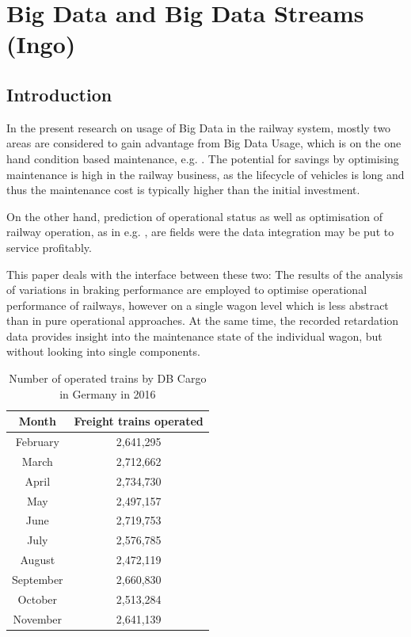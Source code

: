 \documentclass[a4paper, 12pt]{scrartcl}
\begin{document}
\section{Big Data and Big Data Streams (Ingo)}
\subsection{Introduction}
In the present research on usage of Big Data in the railway system, mostly two areas are considered to gain advantage from Big Data Usage, which is on the one hand condition based maintenance, e.g. \cite{fumeo2015condition, thaduri2015railway}. The potential for savings by optimising maintenance is high in the railway business, as the lifecycle of vehicles is long and thus the maintenance cost is typically higher than the initial investment.

On the other hand, prediction of operational status as well as optimisation of railway operation, as in e.g. \cite{papa2016delay, oneto2016delay}, are fields were the data integration may be put to service profitably.

This paper deals with the interface between these two: The results of the analysis of variations in braking performance are employed to optimise operational performance of railways, however on a single wagon level which is less abstract than in pure operational approaches. At the same time, the recorded retardation data  provides insight into the maintenance state of the individual wagon, but without looking into single components.

\begin{table}  
	\begin{center}  
	\caption{Number of operated trains by DB Cargo in Germany in 2016}
	\label{Tab:Zugfahrten}
	\begin{tabular}{|c|c|}
		\hline
		\textbf{Month}	& \textbf{Freight trains operated} \\ \hline
		February & 2,641,295 \\ \hline
		March & 2,712,662 \\ \hline
		April & 2,734,730 \\ \hline
		May & 2,497,157 \\ \hline
		June & 2,719,753 \\ \hline
		July & 2,576,785 \\ \hline
		August & 2,472,119 \\ \hline
		September & 2,660,830 \\ \hline
		October & 2,513,284 \\ \hline
		November & 2,641,139 \\ \hline 
	\end{tabular}
	\end{center}
\end{table}
\end{document}
